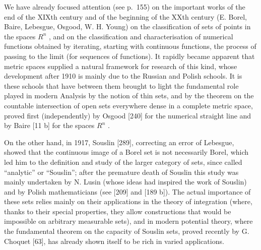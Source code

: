 We have already focused attention (see p.~155) on the important works of the end of the XIXth century and of the beginning of the XXth century (E. Borel, Baire, Lebesgue, Osgood, W. H. Young) on the classification of sets of points in the spaces \(R^{n}\) , and on the classification and characterisation of numerical functions obtained by iterating, starting with continuous functions, the process of passing to the limit (for sequences of functions). It rapidly became apparent that metric spaces supplied a natural framework for research of this kind, whose development after 1910 is mainly due to the Russian and Polish schools. It is these schools that have between them brought to light the fundamental role played in modern Analysis by the notion of thin sets, and by the theorem on the countable intersection of open sets everywhere dense in a complete metric space, proved first (independently) by Osgood {[}240{]} for the numerical straight line and by Baire {[}11 b{]} for the spaces \(R^{n}\) .

On the other hand, in 1917, Souslin {[}289{]}, correcting an error of Lebesgue, showed that the continuous image of a Borel set is not necessarily Borel, which led him to the definition and study of the larger category of sets, since called ``analytic'' or ``Souslin''; after the premature death of Souslin this study was mainly undertaken by N. Lusin (whose ideas had inspired the work of Souslin) and by Polish mathematicians (see {[}209{]} and {[}189 b{]}). The actual importance of these sets relies mainly on their applications in the theory of integration (where, thanks to their special properties, they allow constructions that would be impossible on arbitrary measurable sets), and in modern potential theory, where the fundamental theorem on the capacity of Souslin sets, proved recently by G. Choquet {[}63{]}, has already shown itself to be rich in varied applications.
